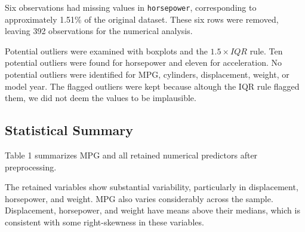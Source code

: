 \documentclass[11pt]{article}
\begin{document}
Six observations had missing values in \texttt{horsepower}, corresponding to
approximately 1.51\% of the original dataset. These six rows were removed,
leaving 392 observations for the numerical analysis.

Potential outliers were examined with boxplots and the $1.5\times IQR$ rule.
Ten potential outliers were found for horsepower and eleven for
acceleration. No potential outliers were identified for MPG, cylinders,
displacement, weight, or model year. The flagged outliers were kept because altough
the IQR rule flagged them, we did not deem the values to be implausible.

\subsection{Statistical Summary}

Table 1 summarizes MPG and all retained numerical
predictors after preprocessing.

\begin{table}[H]
\centering
\caption{AutoMPG descriptive statistics after preprocessing.}
\label{tab:auto-summary}
\end{table}

The retained variables show substantial variability, particularly in
displacement, horsepower, and weight. MPG also varies considerably across the
sample. Displacement, horsepower, and weight have means above their medians,
which is consistent with some right-skewness in these variables.
\end{document}
